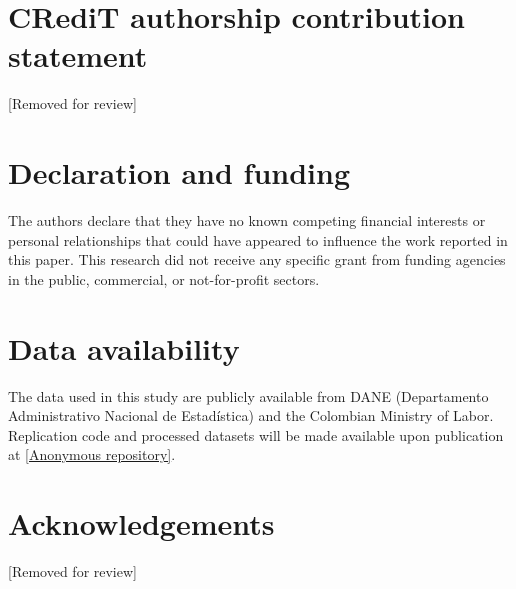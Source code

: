 \documentclass[5p,times,authoryear]{elsarticle}
\begin{document}
\FloatBarrier


\section*{CRediT authorship contribution statement}

[Removed for review]

\section*{Declaration and funding}

The authors declare that they have no known competing financial interests or personal relationships that could have appeared to influence the work reported in this paper. This research did not receive any specific grant from funding agencies in the public, commercial, or not-for-profit sectors.

\section*{Data availability}

The data used in this study are publicly available from DANE (Departamento Administrativo Nacional de Estad\'istica) and the Colombian Ministry of Labor. Replication code and processed datasets will be made available upon publication at \url{[Anonymous repository]}.

\section*{Acknowledgements}

[Removed for review]



\end{document}

